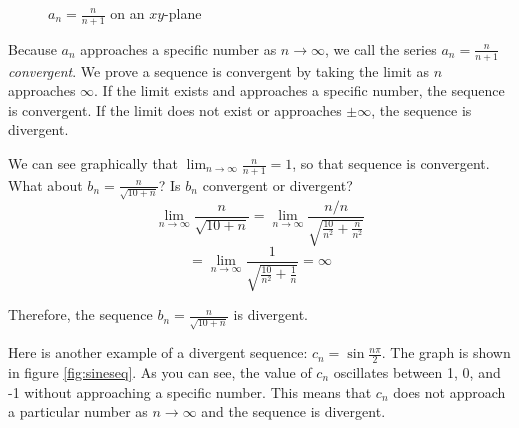 \begin{figure}[htbp]
\centering
    \caption{$a_n =\frac{n}{n+1}$ on an $xy$-plane}
    \label{fig:planefrac}
\end{figure}

Because $a_n$ approaches a specific number as $n \to \infty$, we call 
the series $a_n = \frac{n}{n+1}$ \textit{convergent}. We prove a 
sequence is convergent by taking the limit as $n$ approaches 
$\infty$. If the limit exists and approaches a specific number, the 
sequence is convergent. If the limit does not exist or approaches 
$\pm\infty$, the sequence is divergent. 

We can see graphically that $\lim_{n \to \infty} \frac{n}{n+1} = 1$, 
so that sequence is convergent. What about $b_n = \frac{n}{\sqrt{10 + 
n}}$? Is $b_n$ convergent or divergent? 
$$\lim_{n \to \infty} \frac{n}{\sqrt{10 + n}} = 
\lim_{n \to \infty} \frac{n/n}{\sqrt{\frac{10}{n^2}+ \frac{n}{n^2}}}$$
$$=\lim_{n \to \infty} \frac{1}{\sqrt{\frac{10}{n^2}+\frac{1}{n}}} = \infty$$

Therefore, the sequence $b_n = \frac{n}{\sqrt{10 + n}}$ is divergent. 

Here is another example of a divergent sequence: $c_n = 
\sin{\frac{n\pi}{2}}$. The graph is shown in figure \ref{fig:sineseq}. 
As you can see, the value of $c_n$ oscillates between 1, 0, and -1 
without approaching a specific number. This means that $c_n$ does 
not approach a particular number as $n \to \infty$ and the sequence is 
divergent. 

